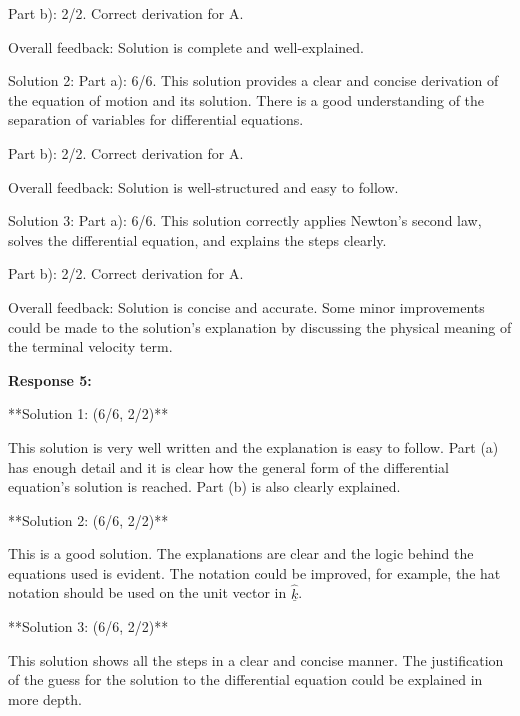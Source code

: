 \documentclass[a4paper,11pt]{article}
\begin{document}
Part b): 2/2. Correct derivation for A.

Overall feedback: Solution is complete and well-explained.

Solution 2:
Part a): 6/6. This solution provides a clear and concise derivation of the equation of motion and its solution. There is a good understanding of the separation of variables for differential equations.

Part b): 2/2. Correct derivation for A.

Overall feedback: Solution is well-structured and easy to follow.

Solution 3:
Part a): 6/6. This solution correctly applies Newton's second law, solves the differential equation, and explains the steps clearly.

Part b): 2/2. Correct derivation for A.

Overall feedback: Solution is concise and accurate. Some minor improvements could be made to the solution's explanation by discussing the physical meaning of the terminal velocity term.

\bigskip    
\textbf{Response 5:}

**Solution 1: (6/6, 2/2)**

This solution is very well written and the explanation is easy to follow. Part (a) has enough detail and it is clear how the general form of the differential equation's solution is reached. Part (b) is also clearly explained.

**Solution 2: (6/6, 2/2)**

This is a good solution. The explanations are clear and the logic behind the equations used is evident. The notation could be improved, for example, the hat notation should be used on the unit vector in \( \hat{\underline{k}} \).

**Solution 3: (6/6, 2/2)**

This solution shows all the steps in a clear and concise manner. The justification of the guess for the solution to the differential equation could be explained in more depth.
\end{document}
